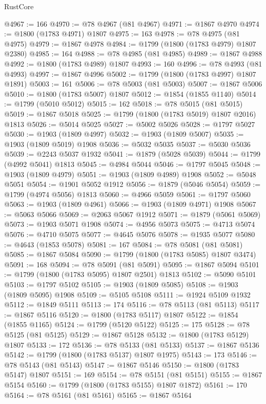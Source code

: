 \begin{lexlean}{RustCore}
\begin{coremodule}
@4967 := 166
@4970 := @78 @4967 (@81 @4967)
@4971 := @1867 @4970
@4974 := @1800 (@1783 @4971) @1807
@4975 := 163
@4978 := @78 @4975 (@81 @4975)
@4979 := @1867 @4978
@4984 := @1799 (@1800 (@1783 @4979) @1807 @2380)
@4985 := 164
@4988 := @78 @4985 (@81 @4985)
@4989 := @1867 @4988
@4992 := @1800 (@1783 @4989) @1807
@4993 := 160
@4996 := @78 @4993 (@81 @4993)
@4997 := @1867 @4996
@5002 := @1799 (@1800 (@1783 @4997) @1807 @1891)
@5003 := 161
@5006 := @78 @5003 (@81 @5003)
@5007 := @1867 @5006
@5010 := @1800 (@1783 @5007) @1807
@5012 := @1854 (@1855 @1140)
@5014 := @1799 (@5010 @5012)
@5015 := 162
@5018 := @78 @5015 (@81 @5015)
@5019 := @1867 @5018
@5025 := @1799 (@1800 (@1783 @5019) @1807 @2016) @1813
@5026 := @5014 @5025
@5027 := @5002 @5026
@5028 := @1797 @5027
@5030 := @1903 (@1809 @4997)
@5032 := @1903 (@1809 @5007)
@5035 := @1903 (@1809 @5019) @1908
@5036 := @5032 @5035
@5037 := @5030 @5036
@5039 := @2243 @5037 @1932
@5041 := @1879 (@5028 @5039)
@5044 := @1799 (@4992 @5041) @1813
@5045 := @4984 @5044
@5046 := @1797 @5045
@5048 := @1903 (@1809 @4979)
@5051 := @1903 (@1809 @4989) @1908
@5052 := @5048 @5051
@5054 := @1901 @5052 @1912
@5056 := @1879 (@5046 @5054)
@5059 := @1799 (@4974 @5056) @1813
@5060 := @4966 @5059
@5061 := @1797 @5060
@5063 := @1903 (@1809 @4961)
@5066 := @1903 (@1809 @4971) @1908
@5067 := @5063 @5066
@5069 := @2063 @5067 @1912
@5071 := @1879 (@5061 @5069)
@5073 := @1903 @5071 @1908
@5074 := @4956 @5073
@5075 := @4713 @5074
@5076 := @4710 @5075
@5077 := @4645 @5076
@5078 := @1935 @5077
@5080 := @4643 (@1853 @5078)
@5081 := 167
@5084 := @78 @5081 (@81 @5081)
@5085 := @1867 @5084
@5090 := @1799 (@1800 (@1783 @5085) @1807 @3474)
@5091 := 168
@5094 := @78 @5091 (@81 @5091)
@5095 := @1867 @5094
@5101 := @1799 (@1800 (@1783 @5095) @1807 @2501) @1813
@5102 := @5090 @5101
@5103 := @1797 @5102
@5105 := @1903 (@1809 @5085)
@5108 := @1903 (@1809 @5095) @1908
@5109 := @5105 @5108
@5111 := @1924 @5109 @1932
@5112 := @1849 @5111
@5113 := 174
@5116 := @78 @5113 (@81 @5113)
@5117 := @1867 @5116
@5120 := @1800 (@1783 @5117) @1807
@5122 := @1854 (@1855 @1165)
@5124 := @1799 (@5120 @5122)
@5125 := 175
@5128 := @78 @5125 (@81 @5125)
@5129 := @1867 @5128
@5132 := @1800 (@1783 @5129) @1807
@5133 := 172
@5136 := @78 @5133 (@81 @5133)
@5137 := @1867 @5136
@5142 := @1799 (@1800 (@1783 @5137) @1807 @1975)
@5143 := 173
@5146 := @78 @5143 (@81 @5143)
@5147 := @1867 @5146
@5150 := @1800 (@1783 @5147) @1807
@5151 := 169
@5154 := @78 @5151 (@81 @5151)
@5155 := @1867 @5154
@5160 := @1799 (@1800 (@1783 @5155) @1807 @1872)
@5161 := 170
@5164 := @78 @5161 (@81 @5161)
@5165 := @1867 @5164

\end{coremodule}
\end{lexlean}
